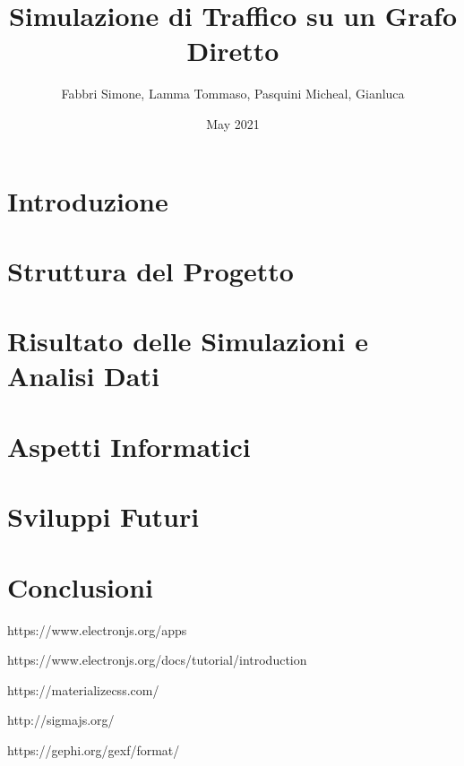 \documentclass{article}
\title{Simulazione di Traffico su un Grafo Diretto}
\author{ Fabbri Simone, Lamma Tommaso, Pasquini Micheal, Gianluca }
\date{May 2021}
\begin{document}
\maketitle

\tableofcontents

\newpage

\section{Introduzione}

    


\section{Struttura del Progetto}

    


\section{Risultato delle Simulazioni e Analisi Dati}

    


\section{Aspetti Informatici}

    

\section{Sviluppi Futuri}
\label{section:sviluppi}

    


\section{Conclusioni}

    

\begin{thebibliography}{9}
https://www.electronjs.org/apps

https://www.electronjs.org/docs/tutorial/introduction

https://materializecss.com/

http://sigmajs.org/

https://gephi.org/gexf/format/

\end{thebibliography}
\end{document}

